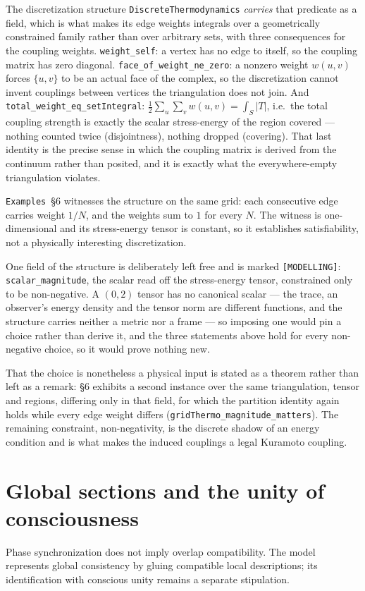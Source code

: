 \documentclass{article}
\begin{document}
The discretization structure \texttt{DiscreteThermodynamics} \emph{carries} that predicate as a field, which is what makes its edge weights integrals over a geometrically constrained family rather than over arbitrary sets, with three consequences for the coupling weights. \nolinkurl{weight_self}: a vertex has no edge to itself, so the coupling matrix has zero diagonal. \nolinkurl{face_of_weight_ne_zero}: a nonzero weight $w(u,v)$ forces $\{u,v\}$ to be an actual face of the complex, so the discretization cannot invent couplings between vertices the triangulation does not join. And \nolinkurl{total_weight_eq_setIntegral}: $\tfrac12\sum_u\sum_v w(u,v) = \int_S |T|$, i.e.\ the total coupling strength is exactly the scalar stress-energy of the region covered --- nothing counted twice (disjointness), nothing dropped (covering). That last identity is the precise sense in which the coupling matrix is derived from the continuum rather than posited, and it is exactly what the everywhere-empty triangulation violates.

\texttt{Examples}~\S6 witnesses the structure on the same grid: each consecutive edge carries weight $1/N$, and the weights sum to $1$ for every $N$. The witness is one-dimensional and its stress-energy tensor is constant, so it establishes satisfiability, not a physically interesting discretization.

One field of the structure is deliberately left free and is marked \texttt{[MODELLING]}: \nolinkurl{scalar_magnitude}, the scalar read off the stress-energy tensor, constrained only to be non-negative. A $(0,2)$ tensor has no canonical scalar --- the trace, an observer's energy density and the tensor norm are different functions, and the structure carries neither a metric nor a frame --- so imposing one would pin a choice rather than derive it, and the three statements above hold for every non-negative choice, so it would prove nothing new.

That the choice is nonetheless a physical input is stated as a theorem rather than left as a remark: \S6 exhibits a second instance over the same triangulation, tensor and regions, differing only in that field, for which the partition identity again holds while every edge weight differs (\nolinkurl{gridThermo_magnitude_matters}). The remaining constraint, non-negativity, is the discrete shadow of an energy condition and is what makes the induced couplings a legal Kuramoto coupling.

\section{Global sections and the unity of consciousness}
\label{sec:supp-compatibility}
Phase synchronization does not imply overlap compatibility. The model represents global consistency by gluing compatible local descriptions; its identification with conscious unity remains a separate stipulation.
\end{document}
